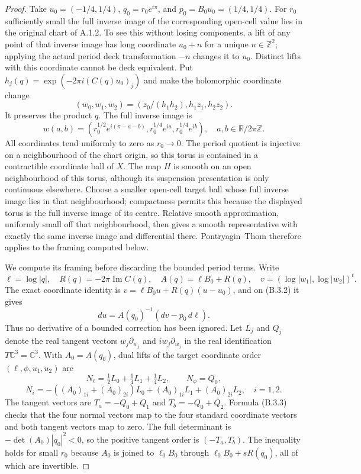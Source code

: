 \begin{proof}
Take $u_0=(-1/4,1/4)$, $q_0=r_0e^{i\pi}$, and
$p_0=B_0u_0=(1/4,1/4)$.  For $r_0$ sufficiently small
the full inverse image of the corresponding open-cell
value lies in the original chart of A.1.2.  To see this
without losing components, a lift of any point of that
inverse image has long coordinate $u_0+n$ for a unique
$n\in\mathbb Z^2$; applying the actual period deck
transformation $-n$ changes it to $u_0$.  Distinct lifts
with this coordinate cannot be deck equivalent.
Put $h_j(q)=\exp(-2\pi i(C(q)u_0)_j)$ and make the
holomorphic coordinate change
\[
 (w_0,w_1,w_2)
   =(z_0/(h_1h_2),h_1z_1,h_2z_2).
\]
It preserves the product $q$.  The full inverse image is
\[
 w(a,b)=
 (r_0^{1/2}e^{i(\pi-a-b)},
  r_0^{1/4}e^{ia},r_0^{1/4}e^{ib}),
 \quad a,b\in\mathbb R/2\pi\mathbb Z.
 \tag{B.3.2}
\]
All coordinates tend uniformly to zero as $r_0\to0$.
The period quotient is injective on a neighbourhood of
the chart origin, so this torus is contained in a
contractible coordinate ball of $X$.
The map $H$ is smooth on an open neighbourhood of this
torus, although its suspension presentation is only
continuous elsewhere.  Choose a smaller open-cell target
ball whose full inverse image lies in that neighbourhood;
compactness permits this because the displayed torus is
the full inverse image of its centre.  Relative smooth
approximation, uniformly small off that neighbourhood,
then gives a smooth representative with exactly the same
inverse image and differential there.  Pontryagin--Thom
therefore applies to the framing computed below.

We compute its framing before discarding the bounded
period terms.  Write
\[
 \ell=\log|q|,\quad
 R(q)=-2\pi\operatorname{Im}C(q),\quad
 A(q)=\ell B_0+R(q),\quad
 v=(\log|w_1|,\log|w_2|)^t.
\]
The exact coordinate identity is
$v=\ell B_0u+R(q)(u-u_0)$, and on (B.3.2) it gives
\[
 du=A(q_0)^{-1}(dv-p_0\,d\ell).
 \tag{B.3.3}
\]
Thus no derivative of a bounded correction has been
ignored.  Let $L_j$ and $Q_j$ denote the real tangent
vectors $w_j\partial_{w_j}$ and $iw_j\partial_{w_j}$
in the real identification $T\mathbb C^3=\mathbb C^3$.
With $A_0=A(q_0)$, dual lifts of the target coordinate
order $(\ell,\phi,u_1,u_2)$ are
\[
 N_\ell=\tfrac12L_0+\tfrac14L_1+\tfrac14L_2,
 \qquad N_\phi=Q_0,
\]
\[
 N_i=-((A_0)_{1i}+(A_0)_{2i})L_0
            +(A_0)_{1i}L_1+(A_0)_{2i}L_2,
 \quad i=1,2.
 \tag{B.3.4}
\]
The tangent vectors are $T_a=-Q_0+Q_1$ and
$T_b=-Q_0+Q_2$.  Formula (B.3.3) checks that the
four normal vectors map to the four standard coordinate
vectors and both tangent vectors map to zero.
The full determinant is
$-\det(A_0)|q_0|^2<0$, so the positive tangent order is
$(-T_a,T_b)$.  The inequality holds for small $r_0$
because $A_0$ is joined to $\ell_0B_0$ through
$\ell_0B_0+sR(q_0)$, all of which are invertible.


\end{proof}
